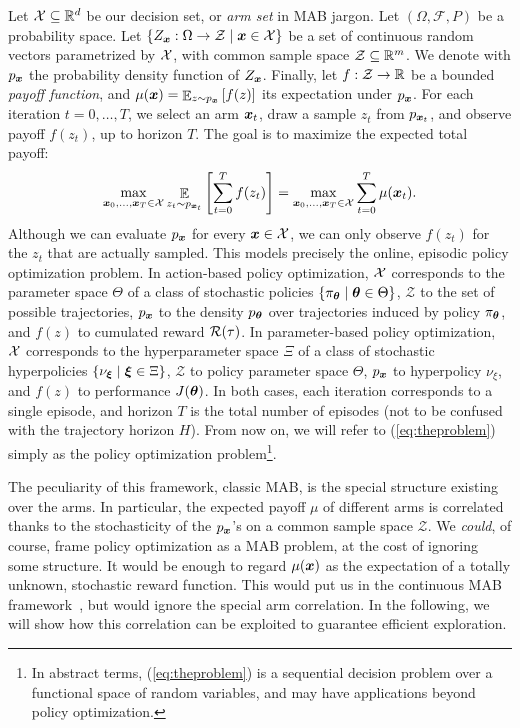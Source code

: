 \documentclass{article}
\begin{document}
Let $\mathcal{X}\subseteq \mathbb{R}^d$ be our decision set, or \textit{arm set} in MAB jargon. Let $(\Omega,\mathcal{F},P)$ be a probability space. Let ${\{Z_{\boldsymbol{x}}:\Omega\to\mathcal{Z}\mid \boldsymbol{x}\in\mathcal{X}\}}$ be a set of continuous random vectors parametrized by $\mathcal{X}$, with common sample space ${\mathcal{Z}\subseteq \mathbb{R}^m}$. We denote with $p_{\boldsymbol{x}}$ the probability density function of $Z_{\boldsymbol{x}}$. Finally, let $f:\mathcal{Z}\to\mathbb{R}$ be a bounded \textit{payoff function}, and $\mu(\boldsymbol{x}) = \mathop{\mathbb{E}}_{z\sim p_{\boldsymbol{x}}}\left[f(z)\right]$ its expectation under $p_{\boldsymbol{x}}$. For each iteration $t=0,\dots,T$, we select an arm $\boldsymbol{x}_t$, draw a sample $z_t$ from $p_{\boldsymbol{x}_t}$, and observe payoff $f(z_t)$, up to horizon $T$. The goal is to maximize the expected total payoff:
\begin{align}\label{eq:theproblem}
\max_{\boldsymbol{x}_0,\dots,\boldsymbol{x}_T\in\mathcal{X}} \mathop{\mathbb{E}}_{z_t\sim p_{\boldsymbol{x}_t}}\left[\sum_{t=0}^T f(z_t)\right] = \max_{\boldsymbol{x}_0,\dots,\boldsymbol{x}_T\in\mathcal{X}}\sum_{t=0}^{T}\mu(\boldsymbol{x}_t).
\end{align}
Although we can evaluate $p_{\boldsymbol{x}}$ for every $\boldsymbol{x}\in\mathcal{X}$, we can only observe $f(z_t)$ for the $z_t$ that are actually sampled. 
This models precisely the online, episodic policy optimization problem.
In action-based policy optimization, $\mathcal{X}$ corresponds to the parameter space $\Theta$ of a class of stochastic policies ${\{\pi_{\boldsymbol{\theta}}\mid\boldsymbol{\theta}\in\Theta\}}$, $\mathcal{Z}$ to the set of possible trajectories, $p_{\boldsymbol{x}}$ to the density $p_{\boldsymbol{\theta}}$ over trajectories induced by policy $\pi_{\boldsymbol{\theta}}$, and $f(z)$ to cumulated reward $\mathcal{R}(\tau)$. 
In parameter-based policy optimization, $\mathcal{X}$ corresponds to the hyperparameter space $\Xi$ of a class of stochastic hyperpolicies $\{\nu_{\boldsymbol{\xi}}\mid\boldsymbol{\xi}\in\Xi\}$, $\mathcal{Z}$ to policy parameter space $\Theta$, $p_{\boldsymbol{x}}$ to hyperpolicy $\nu_{\xi}$, and $f(z)$ to performance $J(\boldsymbol{\theta})$. In both cases, each iteration corresponds to a single episode, and horizon $T$ is the total number of episodes (not to be confused with the trajectory horizon $H$). From now on, we will refer to (\ref{eq:theproblem}) simply as the policy optimization problem\footnote{ In abstract terms, (\ref{eq:theproblem}) is a sequential decision problem over a functional space of random variables, and may have applications beyond policy optimization.}. 

The peculiarity of this framework, \wrt classic MAB, is the special structure existing over the arms. In particular, the expected payoff $\mu$ of different arms is correlated thanks to the stochasticity of the $p_{\boldsymbol{x}}$'s on a common sample space $\mathcal{Z}$.
We \textit{could}, of course, frame policy optimization as a MAB problem, at the cost of ignoring some structure. It would be enough to regard $\mu(\boldsymbol{x})$ as the expectation of a totally unknown, stochastic reward function. This would put us in the continuous MAB framework~\citep{kleinberg2013bandits}, but would ignore the special arm correlation. In the following, we will show how this correlation can be exploited to guarantee efficient exploration.
\end{document}
